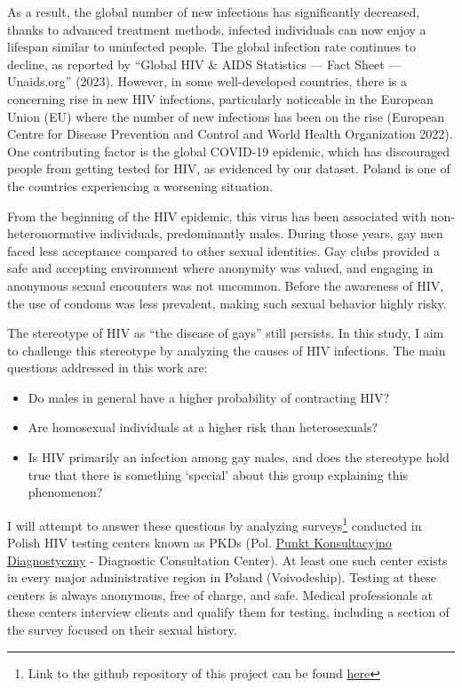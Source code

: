 \documentclass[
  12pt,
  letterpaper,
  DIV=11,
  numbers=noendperiod]{scrartcl}
\providecommand{\tightlist}{%
  \setlength{\itemsep}{0pt}\setlength{\parskip}{0pt}}\usepackage{longtable,booktabs,array}
\begin{document}
As a result, the global number of new infections has significantly
decreased, thanks to advanced treatment methods, infected individuals
can now enjoy a lifespan similar to uninfected people. The global
infection rate continues to decline, as reported by {``{G}lobal
{H}{I}{V} \& {A}{I}{D}{S} Statistics --- {F}act Sheet --- Unaids.org''}
(2023). However, in some well-developed countries, there is a concerning
rise in new HIV infections, particularly noticeable in the European
Union (EU) where the number of new infections has been on the rise
(European Centre for Disease Prevention and Control and World Health
Organization 2022). One contributing factor is the global COVID-19
epidemic, which has discouraged people from getting tested for HIV, as
evidenced by our dataset. Poland is one of the countries experiencing a
worsening situation.

From the beginning of the HIV epidemic, this virus has been associated
with non-heteronormative individuals, predominantly males. During those
years, gay men faced less acceptance compared to other sexual
identities. Gay clubs provided a safe and accepting environment where
anonymity was valued, and engaging in anonymous sexual encounters was
not uncommon. Before the awareness of HIV, the use of condoms was less
prevalent, making such sexual behavior highly risky.

The stereotype of HIV as ``the disease of gays'' still persists. In this
study, I aim to challenge this stereotype by analyzing the causes of HIV
infections. The main questions addressed in this work are:

\begin{itemize}
\tightlist
\item
  Do males in general have a higher probability of contracting HIV?
\item
  Are homosexual individuals at a higher risk than heterosexuals?
\item
  Is HIV primarily an infection among gay males, and does the stereotype
  hold true that there is something `special' about this group
  explaining this phenomenon?
\end{itemize}

I will attempt to answer these questions by analyzing surveys\footnote{Link
  to the github repository of this project can be found
  \href{https://github.com/Niklewa/hivPKDproject}{here}} conducted in
Polish HIV testing centers known as PKDs (Pol.
\href{https://aids.gov.pl/pkd/}{Punkt Konsultacyjno Diagnostyczny} -
Diagnostic Consultation Center). At least one such center exists in
every major administrative region in Poland (Voivodeship). Testing at
these centers is always anonymous, free of charge, and safe. Medical
professionals at these centers interview clients and qualify them for
testing, including a section of the survey focused on their sexual
history.
\end{document}
